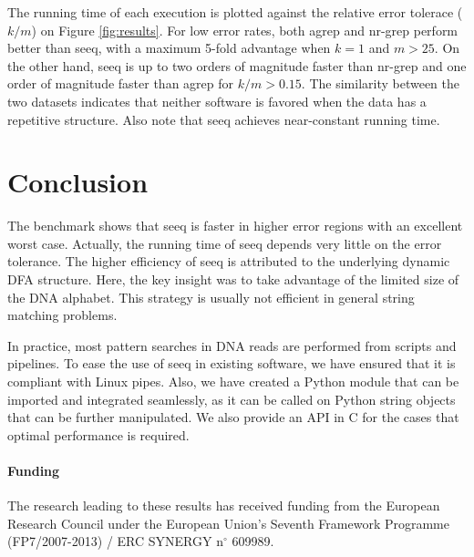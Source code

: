 \documentclass{bioinfo}
\begin{document}
The running time of each execution is plotted against the relative
error tolerace ($k/m$) on Figure \ref{fig:results}. For low error
rates, both agrep and nr-grep perform better than seeq, with a maximum
5-fold advantage when $k=1$ and $m > 25$. On the other hand, seeq is
up to two orders of magnitude faster than nr-grep and one order of
magnitude faster than agrep for $k/m > 0.15$. The similarity between
the two datasets indicates that neither software is favored when the
data has a repetitive structure. Also note that seeq 
achieves near-constant running time.

\section{Conclusion}

The benchmark shows that seeq is faster in higher error regions with
an excellent worst case. Actually, the running time of seeq depends
very little on the error tolerance. The higher efficiency of seeq
is attributed to the underlying dynamic DFA structure. Here, the key
insight was to take advantage of the limited size of the DNA alphabet.
This strategy is usually not efficient in general string matching
problems.

In practice, most pattern searches in DNA reads are performed from
scripts and pipelines. To ease the use of seeq in existing software,
we have ensured that it is compliant with Linux pipes. Also, we have
created a Python module that can be imported and integrated seamlessly,
as it can be called on Python string objects that can be further
manipulated. We also provide an API in C for the cases that optimal
performance is required.


\paragraph{Funding\textcolon}
The research leading to these results has received funding from the
European Research Council under the European Union's Seventh Framework
Programme (FP7/2007-2013) / ERC SYNERGY n$^\circ$ 609989.



%
%
%
%
%
%
%

\end{document}
